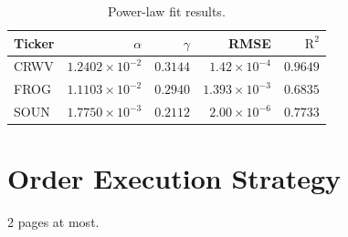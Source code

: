 \documentclass[12pt, letterpaper]{article}
\begin{document}
\begin{table}[h!]
\centering
\begin{tabular}{lrrrr}
\toprule
Ticker & $\alpha$ & $\gamma$ & RMSE & $\mathrm{R}^2$ \\
\midrule
CRWV  & $1.2402\times10^{-2}$ & $0.3144$ & $1.42\times10^{-4}$ & $0.9649$ \\
FROG  & $1.1103\times10^{-2}$ & $0.2940$ & $1.393\times10^{-3}$ & $0.6835$ \\
SOUN  & $1.7750\times10^{-3}$ & $0.2112$ & $2.00\times10^{-6}$ & $0.7733$ \\
\bottomrule
\end{tabular}
\caption{Power-law fit results.}
\end{table}

\section{Order Execution Strategy}

2 pages at most.
\end{document}
